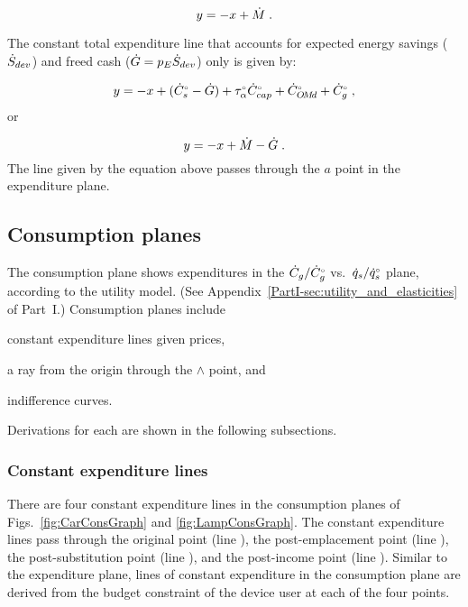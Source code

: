 \begin{equation}
  y = -x + \dot{M} \; .
\end{equation}

The constant total expenditure line 
that accounts for expected energy savings ($\dot{S}_{dev}$) 
and freed cash ($\dot{G} = p_E \dot{S}_{dev}$) only 
is given by:

\begin{equation}
  y = -x + ({}{\dot{C}}^{\scriptscriptstyle \circ}_s - \dot{G}) + {}{\tau}^{\scriptscriptstyle \circ}_\alpha {}{\dot{C}}^{\scriptscriptstyle \circ}_{cap} + {}{\dot{C}}^{\scriptscriptstyle \circ}_{O\!M\!d} + {}{\dot{C}}^{\scriptscriptstyle \circ}_g \; ,
\end{equation}
%
or

\begin{equation}
  y = -x + \dot{M} - \dot{G}\; .
\end{equation}
%
The line given by the equation above
passes through the $a$ point in the expenditure plane.


\subsection{Consumption planes}
\label{sec:cons_path_graph_details}

The consumption plane shows expenditures in 
the $\dot{C}_g/{}{\dot{C}}^{\scriptscriptstyle \circ}_g$ vs.\ $\dot{q}_s/{}{\dot{q}}^{\scriptscriptstyle \circ}_s$ plane,
according to the utility model.
(See Appendix~\ref{PartI-sec:utility_and_elasticities} of Part~I.)
Consumption planes include 
%
\begin{enumerate*}[label={(\roman*)}]
	
  \item constant expenditure lines given prices,
  
  \item a ray from the origin through the $\wedge$ point, and 
  
  \item indifference curves.
    
\end{enumerate*}
%
Derivations for each are shown in the following subsections.


\subsubsection{Constant expenditure lines} 
\label{sec:pref_graph_constant_expenditure_lines}

There are four constant expenditure lines in the consumption planes of
Figs.~\ref{fig:CarConsGraph} and \ref{fig:LampConsGraph}.
The constant expenditure lines pass through 
the original point (line \circcirc{}), 
the post-emplacement point (line \starstar{}), 
the post-substitution point (line \hathatline{}), and 
the post-income point (line \barbarline{}).
Similar to the expenditure plane, 
lines of constant expenditure in the consumption plane
are derived from the budget constraint of the device user
at each of the four points.

